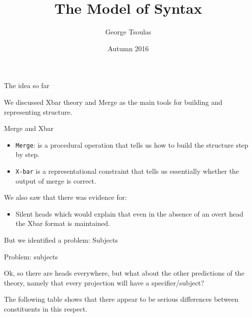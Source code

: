 

\title{The Model of Syntax  }
\date{Autumn 2016}
\author{George Tsoulas}



\maketitle
\begin{frame}
  {The idea so far}

We discussed Xbar theory and Merge as the main tools for building and representing structure.

\end{frame}



\begin{frame}
  {Merge and Xbar}

  \begin{itemize}
\item    \texttt{Merge}:  is a procedural operation that tells us how to build the structure step by step.
  \item \texttt{X-bar} is a representational constraint that tells us essentially whether the output of merge is correct.
  \end{itemize}

\end{frame}


\begin{frame}

  We also saw that there was evidence for:

  \begin{itemize}
  \item Silent heads which would explain that even in the absence of an overt head the Xbar format is maintained.
  \end{itemize}

But we identified a problem:  Subjects

\end{frame}




\begin{frame}
  {Problem:  subjects}

Ok, so there are heads everywhere, but what about the other predictions of the theory, namely that every projection will have a specifier/subject?  

The following table shows that there appear to be serious differences between constituents in this respect.
\end{frame}

